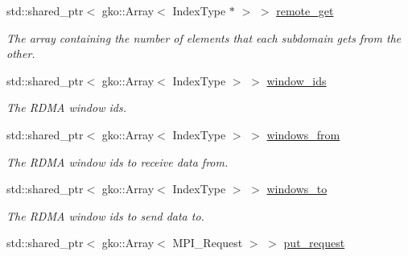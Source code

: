 \begin{DoxyCompactItemize}
std\+::shared\+\_\+ptr$<$ gko\+::\+Array$<$ Index\+Type $\ast$ $>$ $>$ \hyperlink{structschwz_1_1Communicate_1_1comm__struct_a39335cd2ee211817d66189fa6bff7d04}{remote\+\_\+get}
\begin{DoxyCompactList}\small\item\em The array containing the number of elements that each subdomain gets from the other. \end{DoxyCompactList}\item 
\mbox{\label{structschwz_1_1Communicate_1_1comm__struct_a3e6a4293edc659411abf7e50b67da0c5}} 
std\+::shared\+\_\+ptr$<$ gko\+::\+Array$<$ Index\+Type $>$ $>$ \hyperlink{structschwz_1_1Communicate_1_1comm__struct_a3e6a4293edc659411abf7e50b67da0c5}{window\+\_\+ids}
\begin{DoxyCompactList}\small\item\em The R\+D\+MA window ids. \end{DoxyCompactList}\item 
\mbox{\label{structschwz_1_1Communicate_1_1comm__struct_a36dc656e4d4373350bde76da1fc15ba8}} 
std\+::shared\+\_\+ptr$<$ gko\+::\+Array$<$ Index\+Type $>$ $>$ \hyperlink{structschwz_1_1Communicate_1_1comm__struct_a36dc656e4d4373350bde76da1fc15ba8}{windows\+\_\+from}
\begin{DoxyCompactList}\small\item\em The R\+D\+MA window ids to receive data from. \end{DoxyCompactList}\item 
\mbox{\label{structschwz_1_1Communicate_1_1comm__struct_ae850f2a5a6e598f7bf9c3dd34a8a6859}} 
std\+::shared\+\_\+ptr$<$ gko\+::\+Array$<$ Index\+Type $>$ $>$ \hyperlink{structschwz_1_1Communicate_1_1comm__struct_ae850f2a5a6e598f7bf9c3dd34a8a6859}{windows\+\_\+to}
\begin{DoxyCompactList}\small\item\em The R\+D\+MA window ids to send data to. \end{DoxyCompactList}\item 
\mbox{\label{structschwz_1_1Communicate_1_1comm__struct_aaf43321fe2af314a0257e4eecbf5a42c}} 
std\+::shared\+\_\+ptr$<$ gko\+::\+Array$<$ M\+P\+I\+\_\+\+Request $>$ $>$ \hyperlink{structschwz_1_1Communicate_1_1comm__struct_aaf43321fe2af314a0257e4eecbf5a42c}{put\+\_\+request}

\end{DoxyCompactItemize}

